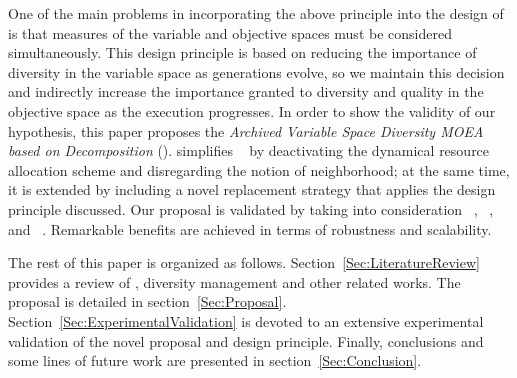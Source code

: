One of the main problems in incorporating the above principle into the design of \MOEAS{} is that
measures of the variable and objective spaces must be considered simultaneously.
%
This design principle is based on reducing the importance of diversity in the variable space as 
generations evolve, so we maintain this decision and indirectly increase the importance granted to diversity 
and quality in the objective space as the execution progresses.
%
%
In order to show the validity of our hypothesis, this paper proposes the
\textit{Archived Variable Space Diversity MOEA based on Decomposition} (\AVSDMOEAD{}).
%
\AVSDMOEAD{} simplifies \MOEADDE{}~\cite{zhang2009performance} by deactivating the dynamical resource allocation
scheme and disregarding the notion of neighborhood;
 at the same time, it is extended by including a novel replacement strategy that applies the design principle discussed.
%
Our proposal is validated by taking into consideration 
\MOEADDE{}~\cite{zhang2009performance}, 
\NSGAII{}~\cite{deb2002fast}, 
\REMOA{}~\cite{trautmann2013r2} and 
\NSGAIII{}~\cite{deb2013evolutionary}.
%
Remarkable benefits are achieved in terms of robustness and scalability.

The rest of this paper is organized as follows.
%
Section~\ref{Sec:LiteratureReview} provides a review of \MOEAS{}, diversity management 
and other related works.
%
The \AVSDMOEAD{} proposal is detailed in section~\ref{Sec:Proposal}.
%
Section~\ref{Sec:ExperimentalValidation} is devoted to an extensive experimental validation of the novel proposal and
design principle.
%
Finally, conclusions and some lines of future work are presented in section~\ref{Sec:Conclusion}.
%
